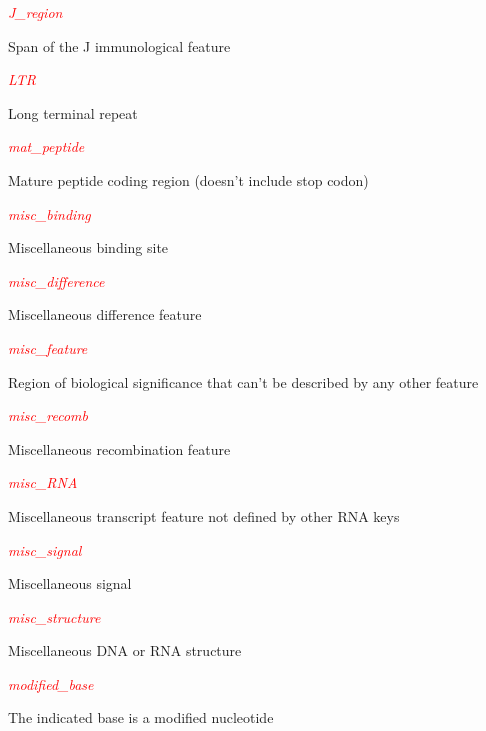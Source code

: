 \textcolor{red}{\textit{J\_region}}
\begin{adjustwidth}{1cm}{}
Span of the J immunological feature
\end{adjustwidth}

\textcolor{red}{\textit{LTR}}
\begin{adjustwidth}{1cm}{}
Long terminal repeat
\end{adjustwidth}

\textcolor{red}{\textit{mat\_peptide}}
\begin{adjustwidth}{1cm}{}
Mature peptide coding region (doesn't include stop codon)
\end{adjustwidth}

\textcolor{red}{\textit{misc\_binding}}
\begin{adjustwidth}{1cm}{}
Miscellaneous binding site
\end{adjustwidth}

\textcolor{red}{\textit{misc\_difference}}
\begin{adjustwidth}{1cm}{}
Miscellaneous difference feature
\end{adjustwidth}

\textcolor{red}{\textit{misc\_feature}}
\begin{adjustwidth}{1cm}{}
Region of biological significance that can't be described by any other feature 
\end{adjustwidth}

\textcolor{red}{\textit{misc\_recomb}}
\begin{adjustwidth}{1cm}{}
Miscellaneous recombination feature
\end{adjustwidth}

\textcolor{red}{\textit{misc\_RNA}}
\begin{adjustwidth}{1cm}{}
Miscellaneous transcript feature not defined by other RNA keys
\end{adjustwidth}

\textcolor{red}{\textit{misc\_signal}}
\begin{adjustwidth}{1cm}{}
Miscellaneous signal
\end{adjustwidth}

\textcolor{red}{\textit{misc\_structure}}
\begin{adjustwidth}{1cm}{}
Miscellaneous DNA or RNA structure
\end{adjustwidth}

\textcolor{red}{\textit{modified\_base}}
\begin{adjustwidth}{1cm}{}
The indicated base is a modified nucleotide
\end{adjustwidth}

